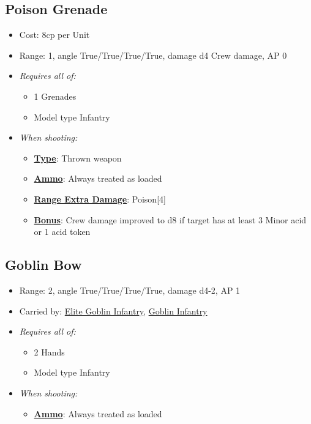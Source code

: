 \documentclass[a4paper,12pt]{article}
\begin{document}
\subsection{Poison Grenade}
\label{equipment-poison-grenade}

\begin{itemize}
\item Cost: 8cp per Unit
\item Range: 1, angle True/True/True/True, damage d4 Crew damage, AP 0
\item \textit{Requires all of:}
\begin{itemize}
\item 1 Grenades
\item Model type Infantry
\end{itemize}
\item \textit{When shooting:}
\begin{itemize}
\item \textbf{\hyperref[rule-special-type]{Type}}: Thrown weapon
\item \textbf{\hyperref[rule-special-ammo]{Ammo}}: Always treated as loaded
\item \textbf{\hyperref[rule-special-range-extra-damage]{Range Extra Damage}}: Poison[4]
\item \textbf{\hyperref[rule-special-bonus]{Bonus}}: Crew damage improved to d8 if target has at least 3 Minor acid or 1 acid token

\end{itemize}






\end{itemize}

\subsection{Goblin Bow}
\label{equipment-goblin-bow}

\begin{itemize}
\item Range: 2, angle True/True/True/True, damage d4-2, AP 1
\item Carried by: \hyperref[model-elite-goblin-infantry]{Elite Goblin Infantry}, \hyperref[model-goblin-infantry]{Goblin Infantry}
\item \textit{Requires all of:}
\begin{itemize}
\item 2 Hands
\item Model type Infantry
\end{itemize}
\item \textit{When shooting:}
\begin{itemize}
\item \textbf{\hyperref[rule-special-ammo]{Ammo}}: Always treated as loaded

\end{itemize}






\end{itemize}
\end{document}
